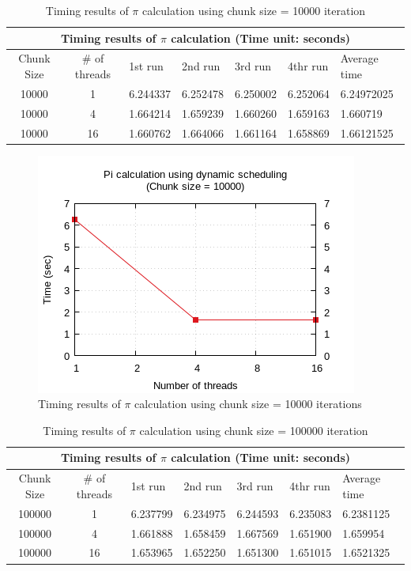 \documentclass{article}
\begin{document}


\begin{table}[htbp]
  \centering
    \begin{tabular}{|c c||l l l l| l|} 
    \hline
    \multicolumn{7}{|c|}{Timing results of $\pi$ calculation (Time unit: seconds)} \\
    \hline
    Chunk Size & \# of threads & 1st run & 2nd run & 3rd run & 4thr run & Average time\\ [0.5ex] 
    \hline\hline
    10000 & 1 & 6.244337 & 6.252478 & 6.250002 & 6.252064 & 6.24972025 \\
    \hline
    10000 & 4 & 1.664214 & 1.659239 & 1.660260 & 1.659163 & 1.660719 \\
    \hline
    10000 & 16 & 1.660762 & 1.664066 & 1.661164 & 1.658869 & 1.66121525 \\ [1ex]
    \hline
    \end{tabular}
  \caption{Timing results of $\pi$ calculation using chunk size = 10000 iteration}
\end{table}

\begin{figure}[htbp]
  \centering
  \includegraphics[width=0.55\columnwidth]{../ex1/plots/pi_c10000.png}
  \caption{Timing results of $\pi$ calculation using chunk size = 10000 iterations}
\end{figure}



\begin{table}[htbp]
  \centering
    \begin{tabular}{|c c||l l l l| l|} 
    \hline
    \multicolumn{7}{|c|}{Timing results of $\pi$ calculation (Time unit: seconds)} \\
    \hline
    Chunk Size & \# of threads & 1st run & 2nd run & 3rd run & 4thr run & Average time\\ [0.5ex] 
    \hline\hline
    100000 & 1 & 6.237799 & 6.234975 & 6.244593 & 6.235083 & 6.2381125 \\
    \hline
    100000 & 4 & 1.661888 & 1.658459 & 1.667569 & 1.651900 & 1.659954 \\
    \hline
    100000 & 16 & 1.653965 & 1.652250 & 1.651300 & 1.651015 & 1.6521325 \\ [1ex]
    \hline
    \end{tabular}
  \caption{Timing results of $\pi$ calculation using chunk size = 100000 iteration}
\end{table}
\end{document}
